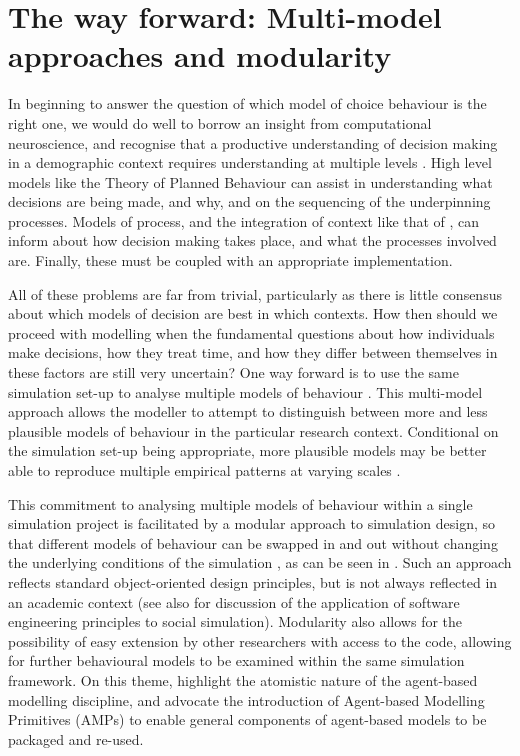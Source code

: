 \documentclass{article}
\begin{document}
\section{The way forward: Multi-model approaches and
modularity}\label{multi-model-approaches-and-modularity}

In beginning to answer the question of which model of choice behaviour is the right one, we would do well to borrow an insight from computational neuroscience, and recognise that a productive understanding of decision making in a demographic context requires understanding at multiple levels \citep{Marr1976,Marr1982}. High level models like the Theory of Planned Behaviour \citep{Ajzen1991} can assist in understanding what decisions are being made, and why, and on the sequencing of the underpinning processes. Models of process, and the integration of context like that of \citet{Ben-Akiva2012}, can inform about how decision making takes place, and what the processes involved are. Finally, these must be coupled with an appropriate implementation. 

All of these problems are far from trivial, particularly as there is little consensus about which models of decision are best in which contexts. How then should we proceed with modelling when the fundamental questions about how individuals make decisions, how they treat time, and how they differ between themselves in these factors are still very uncertain? One way forward is to use the same simulation set-up to analyse multiple models of behaviour \citep{Grimm2005, Epstein2013, Rossiter2014}. This multi-model approach allows the modeller to attempt to distinguish between more and less plausible models of behaviour in the particular research context. Conditional on the simulation set-up being appropriate, more plausible models may be better able to reproduce multiple empirical patterns at varying scales \citep{Werker2004, Bianchi2008}.

This commitment to analysing multiple models of behaviour within a single simulation project is facilitated by a modular approach to simulation design, so that different models of behaviour can be swapped in and out without changing the underlying conditions of the simulation \citep{Epstein2013}, as can be seen in \citet{Gray2016}. Such an approach reflects standard object-oriented design principles, but is not always reflected in an academic context (see also \citet{Rossiter2015} for discussion of the application of software engineering principles to social simulation). Modularity also allows for the possibility of easy extension by other researchers with access to the code, allowing for further behavioural models to be examined within the same simulation framework. On this theme, \cite{Bell2015} highlight the atomistic nature of the agent-based modelling discipline, and advocate the introduction of Agent-based Modelling Primitives (AMPs) to enable general components of agent-based models to be packaged and re-used. 
\end{document}
